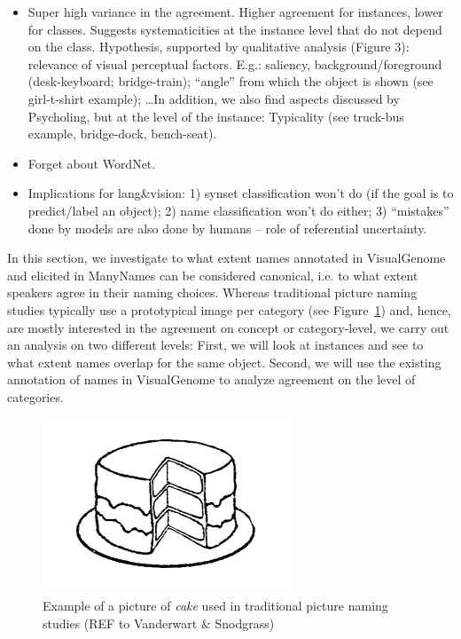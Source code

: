 
\begin{itemize}
\item Super high variance in the agreement. Higher agreement for instances, lower for classes. Suggests systematicities at the instance level that do not depend on the class. Hypothesis, supported by qualitative analysis (Figure 3): relevance of visual perceptual factors. E.g.: saliency, background/foreground (desk-keyboard; bridge-train); ``angle'' from which the object is shown (see girl-t-shirt example); \dots In addition, we also find aspects discussed by Psycholing, but at the level of the instance: Typicality (see truck-bus example, bridge-dock, bench-seat). 
\item Forget about WordNet.
\item Implications for lang\&vision: 1) synset classification won't do (if the goal is to predict/label an object); 2) name classification won't do either; 3) ``mistakes'' done by models are also done by humans -- role of referential uncertainty.
\end{itemize}


In this section, we investigate to what extent names annotated in VisualGenome and elicited in ManyNames can be considered canonical, i.e. to what extent speakers agree in their naming choices.
Whereas traditional picture naming studies typically use a prototypical image per category (see Figure~\ref{fig:picture_naming}) and, hence, are mostly interested in the agreement on concept or category-level, we carry out an analysis on two different levels: First, we will look at instances and see to what extent names overlap for the same object. 
Second, we will use the existing annotation of names in VisualGenome to analyze agreement on the level of categories.
\begin{figure}[t]
	\centering
	\includegraphics[scale=.5]{figures/snodgrass_vanderwart_cake_042.png}
	\caption{Example of a picture of \textsl{cake} used in traditional picture naming studies (REF to Vanderwart \& Snodgrass) \label{fig:picture_naming}}
\end{figure}


